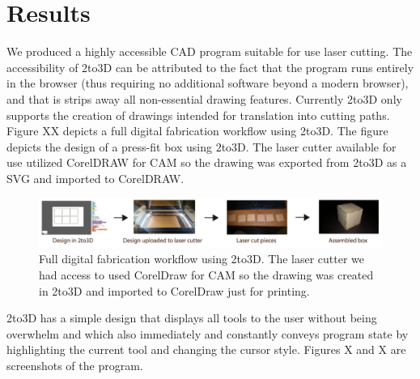 
\section{Results}

%
%
%	
%
%

We produced a highly accessible CAD program suitable for use laser cutting. The accessibility of 2to3D can be attributed to the fact that the program runs entirely in the browser (thus requiring no additional software beyond a modern browser), and that is strips away all non-essential drawing features. Currently 2to3D only supports the creation of drawings intended for translation into cutting paths. Figure XX depicts a full digital fabrication workflow using 2to3D. The figure depicts the design of a press-fit box using 2to3D. The laser cutter available for use utilized CorelDRAW for CAM so the drawing was exported from 2to3D as a SVG and imported to CorelDRAW. 

\begin{figure}[H]
  \includegraphics[width=\linewidth]{usingProgram.jpg}
  \caption{Full digital fabrication workflow using 2to3D. The laser cutter we had access to used CorelDraw for CAM so the drawing was created in 2to3D and imported to CorelDraw just for printing.}
  \label{fig:usingProgram}
\end{figure}

2to3D has a simple design that displays all tools to the user without being overwhelm and which also immediately and constantly conveys program state by highlighting the current tool and changing the cursor style. Figures X and X are screenshots of the program.

